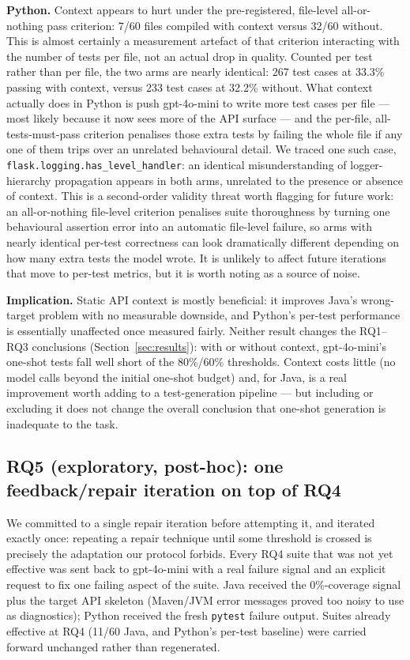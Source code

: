 \textbf{Python.} Context appears to hurt under the pre-registered, file-level
all-or-nothing pass criterion: 7/60 files compiled with context versus 32/60 without. This
is almost certainly a measurement artefact of that criterion interacting with the number
of tests per file, not an actual drop in quality. Counted per test rather than per file,
the two arms are nearly identical: 267 test cases at 33.3\% passing with context, versus
233 test cases at 32.2\% without. What context actually does in Python is push gpt-4o-mini
to write more test cases per file --- most likely because it now sees more of the API
surface --- and the per-file, all-tests-must-pass criterion penalises those extra tests by
failing the whole file if any one of them trips over an unrelated behavioural detail. We
traced one such case, \texttt{flask.logging.has\_level\_handler}: an identical
misunderstanding of logger-hierarchy propagation appears in both arms, unrelated to the
presence or absence of context. This is a second-order validity threat worth flagging for
future work: an all-or-nothing file-level criterion penalises suite thoroughness by
turning one behavioural assertion error into an automatic file-level failure, so arms with
nearly identical per-test correctness can look dramatically different depending on how many
extra tests the model wrote. It is unlikely to affect future iterations that move to
per-test metrics, but it is worth noting as a source of noise.

\textbf{Implication.} Static API context is mostly beneficial: it improves Java's
wrong-target problem with no measurable downside, and Python's per-test performance is
essentially unaffected once measured fairly. Neither result changes the RQ1--RQ3
conclusions (Section~\ref{sec:results}): with or without context, gpt-4o-mini's one-shot
tests fall well short of the 80\%/60\% thresholds. Context costs little (no model calls
beyond the initial one-shot budget) and, for Java, is a real improvement worth adding to a
test-generation pipeline --- but including or excluding it does not change the overall
conclusion that one-shot generation is inadequate to the task.

\subsection{RQ5 (exploratory, post-hoc): one feedback/repair iteration on top of RQ4}
\label{sec:rq5}
We committed to a single repair iteration before attempting it, and iterated exactly once:
repeating a repair technique until some threshold is crossed is precisely the adaptation
our protocol forbids. Every RQ4 suite that was not yet effective was sent back to
gpt-4o-mini with a real failure signal and an explicit request to fix one failing aspect
of the suite. Java received the 0\%-coverage signal plus the target API skeleton
(Maven/JVM error messages proved too noisy to use as diagnostics); Python received the
fresh \texttt{pytest} failure output. Suites already effective at RQ4 (11/60 Java, and
Python's per-test baseline) were carried forward unchanged rather than regenerated.

